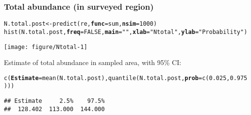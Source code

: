\documentclass[color=usenames,dvipsnames]{beamer}\usepackage[]{graphicx}\usepackage[]{xcolor}
\makeatletter
\newcommand{\hlnum}[1]{\textcolor[rgb]{0.69,0.494,0}{#1}}%
\newcommand{\hlsng}[1]{\textcolor[rgb]{0.749,0.012,0.012}{#1}}%
\newcommand{\hlopt}[1]{\textcolor[rgb]{0,0,0}{#1}}%
\newcommand{\hldef}[1]{\textcolor[rgb]{0,0,0}{#1}}%
\newcommand{\hlkwb}[1]{\textcolor[rgb]{0,0.341,0.682}{#1}}%
\newcommand{\hlkwc}[1]{\textcolor[rgb]{0,0,0}{\textbf{#1}}}%
\newcommand{\hlkwd}[1]{\textcolor[rgb]{0.004,0.004,0.506}{#1}}%
\newenvironment{kframe}{%
 \def\at@end@of@kframe{}%
 \ifinner\ifhmode%
  \def\at@end@of@kframe{\end{minipage}}%
  \begin{minipage}{\columnwidth}%
 \fi\fi%
 \def\FrameCommand##1{\hskip\@totalleftmargin \hskip-\fboxsep
 \colorbox{shadecolor}{##1}\hskip-\fboxsep
     \hskip-\linewidth \hskip-\@totalleftmargin \hskip\columnwidth}%
 \MakeFramed {\advance\hsize-\width
   \@totalleftmargin\z@ \linewidth\hsize
   \@setminipage}}%
 {\par\unskip\endMakeFramed%
 \at@end@of@kframe}
\newenvironment{knitrout}{}{} %
\makeatother
\begin{document}





\begin{frame}[fragile]
  \frametitle{Total abundance (in surveyed region)}
  \footnotesize
\begin{knitrout}\tiny
{}\color{fgcolor}\begin{kframe}
\begin{alltt}
\hldef{N.total.post} \hlkwb{<-} \hlkwd{predict}\hldef{(re,} \hlkwc{func}\hldef{=sum,} \hlkwc{nsim}\hldef{=}\hlnum{1000}\hldef{)}
\hlkwd{hist}\hldef{(N.total.post,} \hlkwc{freq}\hldef{=}\hlnum{FALSE}\hldef{,} \hlkwc{main}\hldef{=}\hlsng{""}\hldef{,} \hlkwc{xlab}\hldef{=}\hlsng{"N total"}\hldef{,} \hlkwc{ylab}\hldef{=}\hlsng{"Probability"}\hldef{)}
\end{alltt}
\end{kframe}

{\centering \texttt{[image: figure/Ntotal-1]} 

}


\end{knitrout}
Estimate of total abundance in sampled area, with 95\% CI:
\begin{knitrout}\tiny
{}\color{fgcolor}\begin{kframe}
\begin{alltt}
\hlkwd{c}\hldef{(}\hlkwc{Estimate}\hldef{=}\hlkwd{mean}\hldef{(N.total.post),} \hlkwd{quantile}\hldef{(N.total.post,} \hlkwc{prob}\hldef{=}\hlkwd{c}\hldef{(}\hlnum{0.025}\hldef{,} \hlnum{0.975}\hldef{)))}
\end{alltt}
\begin{verbatim}
## Estimate     2.5%    97.5% 
##  128.402  113.000  144.000
\end{verbatim}
\end{kframe}
\end{knitrout}
\end{frame}
\end{document}

